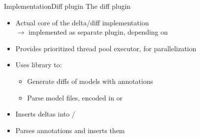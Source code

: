 \begin{frame}{Implementation}{Diff plugin}
	{\Large The diff plugin}
	\\[1.5em]
	\begin{itemize}
		\item Actual core of the delta/diff implementation\\
			$\rightarrow$ implemented as separate plugin, depending on \masymos
		\item Provides prioritized thread pool executor, for parallelization 
		\item Uses \bives library \citep{Scharm2015} to:
		\begin{itemize}
			\item Generate diffs of models with \comodi \citep{Scharm2016} annotations
			\item Parse model files, encoded in \sbml or \cellml
		\end{itemize}
		\item Inserts deltas into \neoj/\masymos
		\item Parses \rdf \comodi annotations and inserts them
	\end{itemize}
\end{frame}

